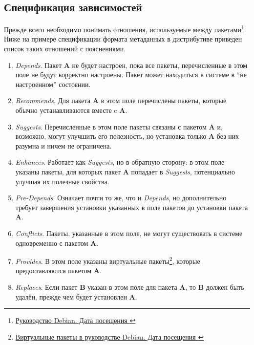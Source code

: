\subsection{Спецификация зависимостей}
Прежде всего необходимо понимать отношения, используемые между пакетами\footnote{\href{https://www.debian.org/doc/debian-policy/ch-relationships.html}{Руководство Debian. Дата посещения }}.
Ниже на примере спецификации формата метаданных в дистрибутиве {\debian} приведен список таких отношений с пояснениями.
\begin{enumerate}
	\item \textit{Depends}.\newline
	      Пакет \textbf{A} не будет настроен, пока все пакеты, перечисленные в этом поле не будут корректно настроены. Пакет может находиться в системе в ``не настроенном'' состоянии.
	\item \textit{Recommends}.\newline
	      Для пакета \textbf{A} в этом поле перечислены пакеты, которые обычно устанавливаются вместе c \textbf{A}.
	\item \textit{Suggests}.\newline
	      Перечисленные в этом поле пакеты связаны с пакетом \textbf{A} и, возможно, могут улучшить его полезность, но установка только \textbf{A} без них разумна и ничем не ограничена.
	\item \textit{Enhances}.\newline
	      Работает как \textit{Suggests}, но в обратную сторону: в этом поле указаны пакеты, для которых пакет \textbf{A} попадает в \textit{Suggests}, потенциально улучшая их полезные свойства.
	\item \textit{Pre-Depends}.\newline
	      Означает почти то же, что и \textit{Depends}, но дополнительно требует завершения установки указанных в поле пакетов до установки пакета \textbf{A}.
	\item \textit{Conflicts}.\newline
	      Пакеты, указанные в этом поле, не могут существовать в системе одновременно с пакетом \textbf{A}.
	\item \textit{Provides}.\newline
	      В этом поле указаны виртуальные пакеты\footnote{\href{https://www.debian.org/doc/debian-policy/ch-binary.html\#s-virtual-pkg}{Виртуальные пакеты в руководстве Debian. Дата посещения }}, которые предоставляются пакетом \textbf{A}.
	\item \textit{Replaces}.\newline
	      Если пакет \textbf{B} указан в этом поле для пакета \textbf{A}, то \textbf{B} должен быть удалён, прежде чем будет установлен \textbf{A}.
\end{enumerate}

